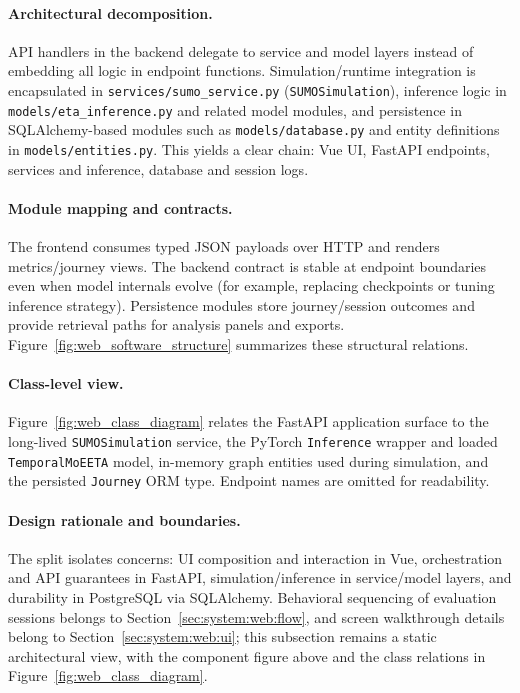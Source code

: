 \paragraph{Architectural decomposition.}
\begin{sloppypar}
API handlers in the backend delegate to service and model layers instead of embedding all logic in endpoint functions. Simulation/runtime integration is encapsulated in \texttt{services/sumo\_service.py} (\texttt{SUMOSimulation}), inference logic in \texttt{models/eta\_inference.py} and related model modules, and persistence in SQLAlchemy-based modules such as \texttt{models/database.py} and entity definitions in \texttt{models/entities.py}. This yields a clear chain: Vue UI, FastAPI endpoints, services and inference, database and session logs.
\end{sloppypar}

\paragraph{Module mapping and contracts.}
The frontend consumes typed JSON payloads over HTTP and renders metrics/journey views. The backend contract is stable at endpoint boundaries even when model internals evolve (for example, replacing checkpoints or tuning inference strategy). Persistence modules store journey/session outcomes and provide retrieval paths for analysis panels and exports. Figure~\ref{fig:web_software_structure} summarizes these structural relations.



\paragraph{Class-level view.}
Figure~\ref{fig:web_class_diagram} relates the FastAPI application surface to the long-lived \texttt{SUMOSimulation} service, the PyTorch \texttt{Inference} wrapper and loaded \texttt{TemporalMoEETA} model, in-memory graph entities used during simulation, and the persisted \texttt{Journey} ORM type. Endpoint names are omitted for readability.



\paragraph{Design rationale and boundaries.}
The split isolates concerns: UI composition and interaction in Vue, orchestration and API guarantees in FastAPI, simulation/inference in service/model layers, and durability in PostgreSQL via SQLAlchemy. Behavioral sequencing of evaluation sessions belongs to Section~\ref{sec:system:web:flow}, and screen walkthrough details belong to Section~\ref{sec:system:web:ui}; this subsection remains a static architectural view, with the component figure above and the class relations in Figure~\ref{fig:web_class_diagram}.

